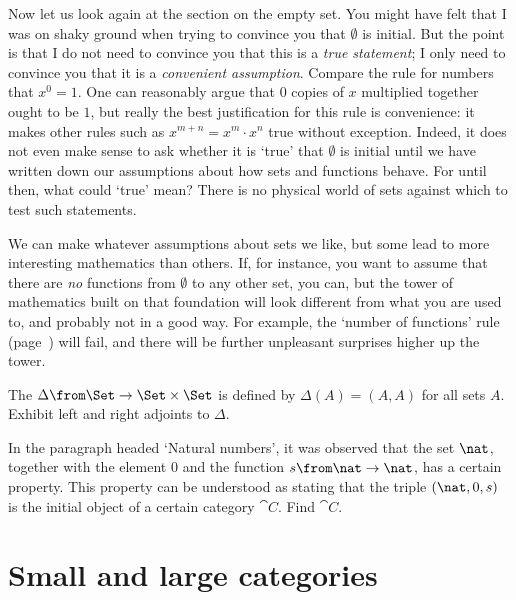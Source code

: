Now let us look again at the section on the empty%
%
%
set.  You might have felt that I was on shaky ground when trying to
convince you that $\emptyset$ is initial.  But the point is that I do not
need to convince you that this is a \emph{true statement}; I only need to
convince you that it is a \emph{convenient assumption}.  Compare the rule
for numbers that $x^0 = 1$.  One can reasonably argue that $0$ copies of
$x$ multiplied together ought to be $1$, but really the best justification
for this rule is convenience: it makes other rules such as $x^{m + n} = x^m
\cdot x^n$ true without exception.  Indeed, it does not even make sense to
ask whether it is `true' that $\emptyset$ is initial until we have written
down our assumptions about how sets and functions behave.  For until then,
what could `true' mean?  There is no physical world of sets against which
to test such statements.

We can make whatever assumptions about sets we like, but some lead to more
interesting mathematics than others.  If, for instance, you want to assume
that there are \emph{no} functions from $\emptyset$ to any other set, you
can, but the tower of mathematics built on that foundation will look
different from what you are used to, and probably not in a good way.  For
example, the `number of functions' rule (page~\pageref{p:num-fns}) will
fail, and there will be further unpleasant surprises higher up the tower.%
%
%
%
%

\exs


\begin{question}        
\label{ex:diagonal-Set}
The  $\Delta\from \Set \to \Set \times \Set$%
%
%
is defined by $\Delta(A) = (A, A)$ for all sets $A$.  Exhibit left and
right adjoints to $\Delta$.
\end{question}


\begin{question}        
\label{ex:nno}
In the paragraph headed `Natural numbers', it was observed that the set
$\nat$, together with the element $0$ and the function $s\from \nat \to
\nat$, has a certain property.  This property can be understood as stating
that the triple $(\nat, 0, s)$ is the initial object of a certain category
$\cat{C}$.  Find $\cat{C}$.
\end{question}



\section{Small and large categories}
\label{sec:small-large}


